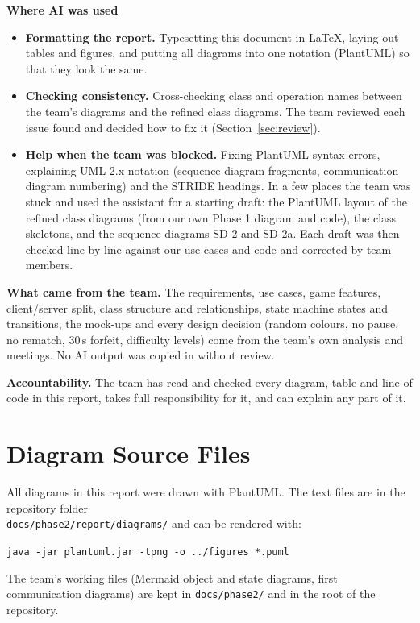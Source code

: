\documentclass[11pt,a4paper]{article}
\begin{document}
\textbf{Where AI was used}
\begin{itemize}
  \item \textbf{Formatting the report.} Typesetting this document in \LaTeX, laying out tables and figures, and putting all diagrams into one notation (PlantUML) so that they look the same.
  \item \textbf{Checking consistency.} Cross-checking class and operation names between the team's diagrams and the refined class diagrams. The team reviewed each issue found and decided how to fix it (Section~\ref{sec:review}).
  \item \textbf{Help when the team was blocked.} Fixing PlantUML syntax errors, explaining UML 2.x notation (sequence diagram fragments, communication diagram numbering) and the STRIDE headings. In a few places the team was stuck and used the assistant for a starting draft: the PlantUML layout of the refined class diagrams (from our own Phase 1 diagram and code), the class skeletons, and the sequence diagrams SD-2 and SD-2a. Each draft was then checked line by line against our use cases and code and corrected by team members.
\end{itemize}

\textbf{What came from the team.} The requirements, use cases, game features, client/server split, class structure and relationships, state machine states and transitions, the mock-ups and every design decision (random colours, no pause, no rematch, 30\,s forfeit, difficulty levels) come from the team's own analysis and meetings. No AI output was copied in without review.

\textbf{Accountability.} The team has read and checked every diagram, table and line of code in this report, takes full responsibility for it, and can explain any part of it.

\appendix
\section{Diagram Source Files}\label{app:sources}

All diagrams in this report were drawn with PlantUML. The text files are in the repository folder\\ \texttt{docs/phase2/report/diagrams/} and can be rendered with:

\texttt{java -jar plantuml.jar -tpng -o ../figures *.puml}

The team's working files (Mermaid object and state diagrams, first communication diagrams) are kept in \texttt{docs/phase2/} and in the root of the repository.
\end{document}
